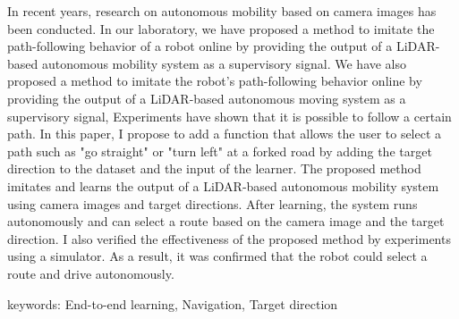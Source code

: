 In recent years, research on autonomous mobility based on camera images has been conducted.
In our laboratory, we have proposed a method to imitate the path-following behavior of a robot online by providing the output of a LiDAR-based autonomous mobility system as a supervisory signal. 
We have also proposed a method to imitate the robot's path-following behavior online by providing the output of a LiDAR-based autonomous moving system as a supervisory signal, Experiments have shown that it is possible to follow a certain path.
In this paper, I propose to add a function that allows the user to select a path such as "go straight" or "turn left" at a forked road by adding the target direction  to the dataset and the input of the learner.
The proposed method imitates and learns the output of a LiDAR-based autonomous mobility system using camera images and target directions.
After learning, the system runs autonomously and can select a route based on the camera image and the target direction.
I also verified the effectiveness of the proposed method by experiments using a simulator. 
As a result, it was confirmed that the robot could select a route and drive autonomously.

keywords: End-to-end learning, Navigation, Target direction
